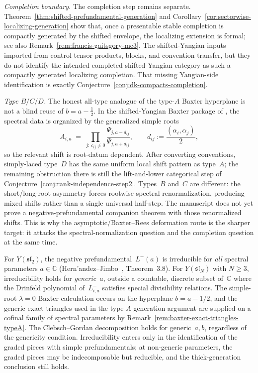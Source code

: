 \begin{remark}
\smallskip\noindent\emph{Completion boundary.}
The completion step remains separate. Theorem~\ref{thm:shifted-prefundamental-generation}
and Corollary~\ref{cor:sectorwise-localizing-generation} show that,
once a presentable stable completion is compactly generated by the
shifted envelope, the localizing extension is formal; see also
Remark~\ref{rem:francis-gaitsgory-mc3}. The shifted-Yangian inputs
imported from \cite{HZ24,GTL17,HJZ25} control tensor products, blocks,
and convention transfer, but they do not identify the intended
completed shifted Yangian category as such a compactly generated
localizing completion. That missing Yangian-side identification is
exactly Conjecture~\ref{conj:dk-compacts-completion}.

\smallskip\noindent\emph{Type \texorpdfstring{$B/C/D$}{B/C/D}.}
The honest all-type analogue of the type-$A$ Baxter hyperplane is not
a blind reuse of $b = a-\tfrac{1}{2}$. In the shifted-Yangian Baxter
package of \cite{HZ24}, the spectral data is organized by the
generalized simple roots
\[
 A_{i,a}
 \;=\;
 \prod_{j:\,c_{ij}\neq 0}
 \frac{\Psi_{j,a-d_{ij}}}{\Psi_{j,a+d_{ij}}},
 \qquad
 d_{ij} := \frac{(\alpha_i,\alpha_j)}{2},
\]
so the relevant shift is root-datum dependent. After converting
conventions, simply-laced type~$D$ has the same uniform local shift
pattern as type~$A$; the remaining obstruction there is still the
lift-and-lower categorical step of
Conjecture~\ref{conj:rank-independence-step2}. Types~$B$ and~$C$ are
different: the short/long-root asymmetry forces rootwise spectral
renormalization, producing mixed shifts rather than a single
universal half-step. The manuscript does not yet prove a
negative-prefundamental companion theorem with those renormalized
shifts. This is why the asymptotic/Baxter--Rees deformation route is
the sharper target: it attacks the spectral-normalization question and
the completion question at the same time.
\end{remark}

\begin{remark}
\label{rem:prefundamental-genericity-higher-rank}
For $Y(\mathfrak{sl}_2)$, the negative prefundamental~$L^-(a)$
is irreducible for \emph{all} spectral parameters $a \in \mathbb{C}$
(Hern'andez--Jimbo~\cite{HJZ25}, Theorem~3.8).
For $Y(\mathfrak{sl}_N)$ with $N \ge 3$, irreducibility holds
for \emph{generic}~$a$, outside a countable, discrete subset
of~$\mathbb{C}$ where the Drinfeld polynomial of~$L^-_{i,a}$
satisfies special divisibility relations. The simple-root
$\lambda = 0$ Baxter calculation occurs on the hyperplane
$b = a - 1/2$, and the generic exact triangles used in the
type-$A$ generation argument are supplied on a cofinal family of
spectral parameters by
Remark~\ref{rem:baxter-exact-triangles-typeA}. The
Clebsch--Gordan decomposition holds for generic~$a, b$, regardless
of the genericity condition. Irreducibility enters
only in the identification of the graded pieces with simple
prefundamentals; at non-generic parameters, the graded pieces
may be indecomposable but reducible, and the thick-generation
conclusion still holds.
\end{remark}

